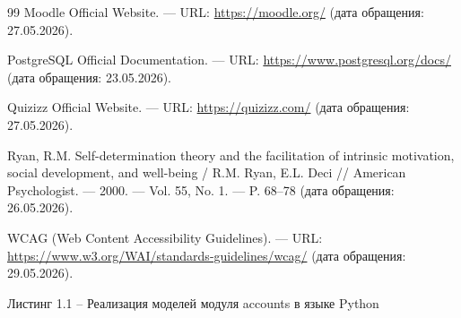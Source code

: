\documentclass[14pt,a4paper]{extreport}
\begin{document}
\begin{thebibliography}{99}
 Moodle Official Website. — URL: \url{https://moodle.org/} (дата обращения: 27.05.2026).

 PostgreSQL Official Documentation. — URL: \url{https://www.postgresql.org/docs/} (дата обращения: 23.05.2026).

 Quizizz Official Website. — URL: \url{https://quizizz.com/} (дата обращения: 27.05.2026).

 Ryan, R.M. Self-determination theory and the facilitation of intrinsic motivation, social development, and well-being / R.M. Ryan, E.L. Deci // American Psychologist. — 2000. — Vol. 55, No. 1. — P. 68–78 (дата обращения: 26.05.2026).

 WCAG (Web Content Accessibility Guidelines). — URL: \url{https://www.w3.org/WAI/standards-guidelines/wcag/} (дата обращения: 29.05.2026).
\end{thebibliography}

\newpage
\applications

\begin{flushright}
Листинг 1.1 -- Реализация моделей модуля accounts в языке Python
\end{flushright}
\end{document}
